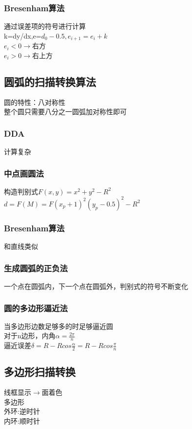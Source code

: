 \documentclass{article}
\begin{document}
\begin{CJK}{UTF8}{gbsn}
	\subsubsection{Bresenham算法}
	通过误差项的符号进行计算\\
	k=dy/dx,e=$d_0-0.5,e_{i+1}=e_{i}+k$\\
	$e_{i}<0\rightarrow$右方\\
	$e_{i}>0\rightarrow$右上方\\
	\subsection{圆弧的扫描转换算法}
	圆的特性：八对称性\\
	整个圆只需要八分之一圆弧加对称性即可\\
	\subsubsection{DDA}
	计算复杂\\
	\subsubsection{中点画圆法}
	构造判别式$F(x,y)=x^2+y^2-R^2$\\
	$d=F(M)=F(x_p+1)^2(y_p-0.5)^2-R^2$\\
	\subsubsection{Bresenham算法}
	和直线类似\\
	\subsubsection{生成圆弧的正负法}
	一个点在圆弧内，下一个点在圆弧外，判别式的符号不断变化\\
	\subsubsection{圆的多边形逼近法}
	当多边形边数足够多的时足够逼近圆\\
	对于n边形，内角$\alpha=\frac{2\pi}{n}$\\
	逼近误差$\delta=R-Rcos\frac{\alpha}{2}=R-Rcos\frac{\pi}{n}$\\
	\subsection{多边形扫描转换}
	线框显示$\rightarrow$面着色\\
	多边形\\
	外环:逆时针\\
	内环:顺时针\\

\end{CJK}
\end{document}
